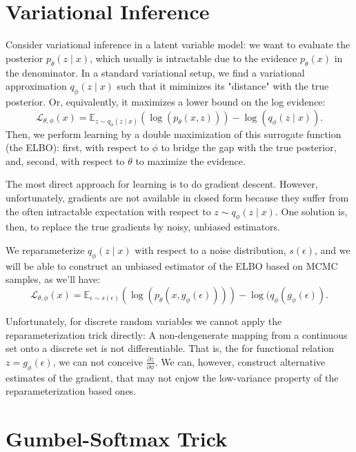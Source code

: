 \documentclass[11pt]{article}
\def\L{\mathcal{L}}
\def\E{\mathbb{E}}
\def\eps{\epsilon}
\begin{document}
\section{Variational Inference}

Consider variational inference in a latent variable model: we want to evaluate the posterior $p_\theta(z \mid x)$, which usually is intractable due to the evidence $p_\theta(x)$ in the denominator. In a standard variational setup, we find a variational approximation $q_\phi(z \mid x)$ such that it miminizes its "distance" with the true posterior. Or, equivalently, it maximizes a lower bound on the log evidence:
\begin{equation}
\L_{\theta,\phi}(x) = \E_{z\sim q_\phi(z\mid x)}(\log(p_\theta(x,z)))-\log(q_\phi(z\mid x)).
\end{equation}
Then, we perform learning by a double maximization of this surrogate function (the ELBO): first, with respect to $\phi$ to bridge the gap with the true posterior, and, second, with respect to $\theta$ to maximize the evidence.

The most direct approach for learning is to do gradient descent. However, unfortunately, gradients are not available in closed form because they suffer from the often intractable expectation with respect to $z\sim q_\phi(z\mid x)$. One solution is, then, to replace the true gradients by noisy, unbiased estimators.

We reparameterize $q_\phi(z\mid x)$ with respect to a noise distribution, $s(\eps)$, and we will be able to construct an unbiased estimator of the ELBO based on MCMC samples, as we'll have:
\begin{equation}
\L_{\theta,\phi}(x) = \E_{\eps\sim s(\eps)}(\log(p_\theta(x,g_\phi(\eps))))-\log(q_\phi(g_\phi(\eps)).
\end{equation}

Unfortunately, for discrete random variables we cannot apply the reparameterization trick directly: A non-dengenerate mapping from a continuous set onto a discrete set is not differentiable. That is, the for functional relation $z = g_\phi(\eps)$, we can not conceive $\frac{\partial z}{\partial \phi}$. We can, however, construct alternative estimates of the gradient, that may not enjow the low-variance property of the reparameterization based ones.

\section{Gumbel-Softmax Trick}
\end{document}
